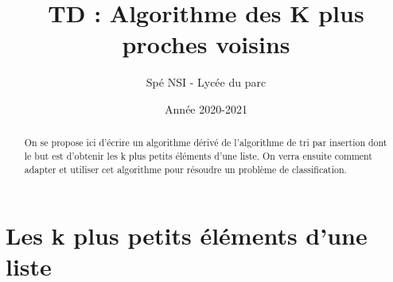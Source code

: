 



\author{Spé NSI - Lycée du parc}  %
\title{TD : Algorithme des K plus proches voisins}  %
\date{Année 2020-2021} %
\renewcommand{\thesection}{\Roman{section}}  %
\pagestyle{fancy}



\fancyfoot[C]{\thepage} %
\fancyfoot[L]{} %
\fancyfoot[R]{} %
\newcommand{\p}[1]{ \left( #1 \right)}   %
\newcommand\abs[1]{|{#1}|}



\maketitle  %
\thispagestyle{empty}
\vskip 1cm
\renewcommand{\abstractname}{Introduction\hfill}
\begin{abstract} 

On se propose ici d'écrire un algorithme dérivé de l'algorithme de tri par insertion dont le but est d'obtenir les k plus petits éléments d'une liste. On verra ensuite comment adapter et utiliser cet algorithme pour résoudre un problème de classification.
\end{abstract} 


\section{Les k plus petits éléments d'une liste}

